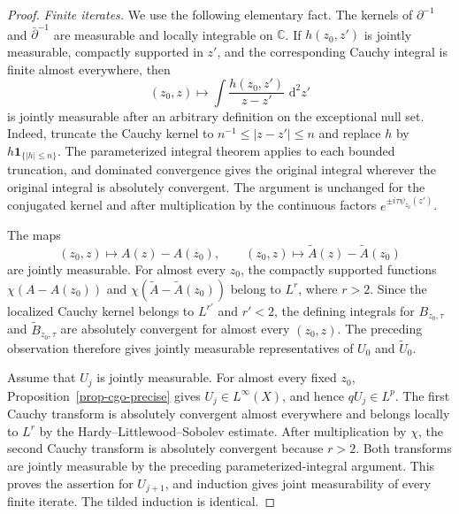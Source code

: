 \documentclass[a4paper,11pt]{article}
\newcommand{\C}{\mathbb{C}}
\newcommand{\dd}{\,\text{d}}
\theoremstyle{plain}
\theoremstyle{definition}
\theoremstyle{remark}
\begin{document}
\begin{proof}
\noindent\emph{Finite iterates.}
We use the following elementary fact.  The kernels of $\partial^{-1}$ and
$\bar\partial^{-1}$ are measurable and locally
integrable on $\C$.  If $h(z_0,z')$ is jointly measurable, compactly supported
in $z'$, and the corresponding Cauchy integral is finite almost everywhere,
then
\begin{equation*}
        (z_0,z)\longmapsto
        \int \frac{h(z_0,z')}{z-z'}\,\dd^2z'
\end{equation*}
is jointly measurable after an arbitrary definition on the exceptional null set.  Indeed, truncate the Cauchy kernel to $n^{-1}\leq |z-z'|\leq n$ and replace $h$ by
$h\mathbf 1_{\{|h|\leq n\}}$.  The parameterized integral theorem applies to
each bounded truncation, and dominated convergence gives the original integral
wherever the original integral is absolutely convergent.  The argument is unchanged for the conjugated kernel and after multiplication by the continuous factors $e^{\pm i\tau\psi_{z_0}(z')}$.

The maps
\begin{equation*}
        (z_0,z)\longmapsto A(z)-A(z_0),
        \qquad
        (z_0,z)\longmapsto \widetilde A(z)-\widetilde A(z_0)
\end{equation*}
are jointly measurable.  For almost every $z_0$, the compactly supported
functions $\chi(A-A(z_0))$ and
$\chi(\widetilde A-\widetilde A(z_0))$ belong to $L^r$, where $r>2$.
Since the localized Cauchy kernel belongs to $L^{r'}$ and $r'<2$, the defining
integrals for $B_{z_0,\tau}$ and $\widetilde B_{z_0,\tau}$ are absolutely
convergent for almost every $(z_0,z)$.  The preceding observation therefore
gives jointly measurable representatives of $U_0$ and $\widetilde U_0$.

Assume that $U_j$ is jointly measurable.  For almost every fixed
$z_0$, Proposition~\ref{prop-cgo-precise} gives $U_j\in L^\infty(X)$, and hence
$qU_j\in L^p$.  The first Cauchy transform is absolutely convergent almost
everywhere and belongs locally to $L^r$ by the Hardy--Littlewood--Sobolev
estimate.  After multiplication by $\chi$, the second Cauchy transform is
absolutely convergent because $r>2$.  Both transforms are jointly measurable by
the preceding parameterized-integral argument.  This proves the assertion for
$U_{j+1}$, and induction gives joint measurability of every finite iterate.  The
tilded induction is identical.


\end{proof}
\end{document}
